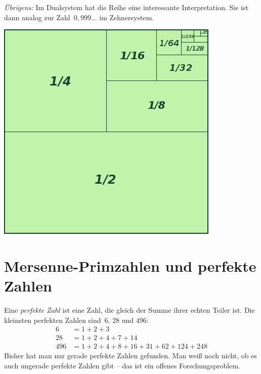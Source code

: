 \documentclass{../zirkelblatt}
\begin{document}
\emph{Übrigens:} Im Dualsystem hat die Reihe eine interessante Interpretation. Sie
ist dann analog zur Zahl~$0{,}999\ldots$ im Zehnersystem.
\begin{center}
\includegraphics[scale=0.5]{geometrische-reihe-4}
\end{center}


\vfill
\section*{Mersenne-Primzahlen und perfekte Zahlen}
Eine \emph{perfekte Zahl} ist eine Zahl, die gleich der Summe ihrer echten
Teiler ist. Die kleinsten perfekten Zahlen sind~$6$, $28$ und $496$:
\begin{align*}
  6 &= 1 + 2 + 3 \\
  28 &= 1 + 2 + 4 + 7 + 14 \\
  496 &= 1 + 2 + 4 + 8 + 16 + 31 + 62 + 124 + 248
\end{align*}
Bisher hat man nur gerade perfekte Zahlen gefunden. Man weiß noch nicht, ob es
auch ungerade perfekte Zahlen gibt -- das ist ein offenes Forschungsproblem.
\end{document}
